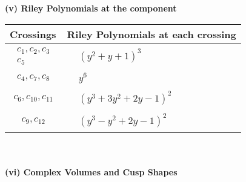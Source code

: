 \documentclass[1p]{elsarticle_modified}
\theoremstyle{definition}
\begin{document}
\newpage\renewcommand{\arraystretch}{1}
\flushleft \textbf{(v) Riley Polynomials at the component}\newline \\
\begin{tabular}{m{50pt}|m{274pt}}
Crossings & \hspace{64pt}Riley Polynomials at each crossing \\
\hline $$\begin{aligned}c_{1},c_{2},c_{3}\\c_{5}\end{aligned}$$&$\begin{aligned}
&(y^2+y+1)^3
\end{aligned}$\\
\hline $$\begin{aligned}c_{4},c_{7},c_{8}\end{aligned}$$&$\begin{aligned}
&y^6
\end{aligned}$\\
\hline $$\begin{aligned}c_{6},c_{10},c_{11}\end{aligned}$$&$\begin{aligned}
&(y^3+3 y^2+2 y-1)^2
\end{aligned}$\\
\hline $$\begin{aligned}c_{9},c_{12}\end{aligned}$$&$\begin{aligned}
&(y^3- y^2+2 y-1)^2
\end{aligned}$\\
\hline
\end{tabular}\\~\\
\newpage\flushleft \textbf{(vi) Complex Volumes and Cusp Shapes}
\end{document}
